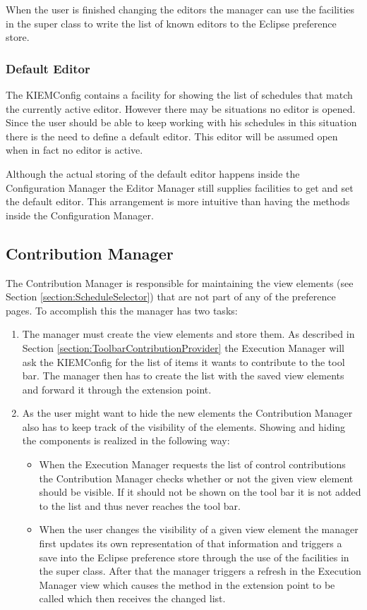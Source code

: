 When the user is finished changing the editors the manager can use the facilities in the super class to
write the list of known editors to the Eclipse preference store.


\subsubsection{Default Editor}
\label{section:DefaultEditor}
The \ac{KIEMConfig} contains a facility for showing the list of schedules that match the currently active
editor. However there may be situations no editor is opened. Since the user should be able to keep working
with his schedules in this situation there is the need to define a default editor. This editor will be assumed open 
when in fact no editor is active.

Although the actual storing of the default editor happens inside the Configuration Manager the Editor Manager
still supplies facilities to get and set the default editor. This arrangement is more intuitive than having
the methods inside the Configuration Manager.


\subsection{Contribution Manager}
\label{section:ContributionManager}
The Contribution Manager is responsible for maintaining the view elements (see Section \ref{section:ScheduleSelector}) 
that are not part of any of the preference pages. To accomplish this the manager has two tasks:
\begin{enumerate}
 \item The manager must create the view elements and store them. As described in Section 
\ref{section:ToolbarContributionProvider} the Execution Manager will ask the \ac{KIEMConfig}
for the list of items it wants to contribute to the tool bar. The manager then has to 
create the list with the saved view elements and forward it through the extension point.
 \item As the user might want to hide the new elements the Contribution Manager also has to 
keep track of the visibility of the elements. Showing and hiding the components is realized
in the following way:
\begin{itemize}
 \item When the Execution Manager requests the list of control contributions the Contribution Manager
checks whether or not the given view element should be visible. If it should not be shown on the tool bar
it is not added to the list and thus never reaches the tool bar.
 \item When the user changes the visibility of a given view element the manager first updates its own
representation of that information and triggers a save into the Eclipse preference store through the use
of the facilities in the super class. After that the manager triggers a refresh in the Execution Manager
view which causes the method in the extension point to be called which then receives the changed list.
\end{itemize}
\end{enumerate}



